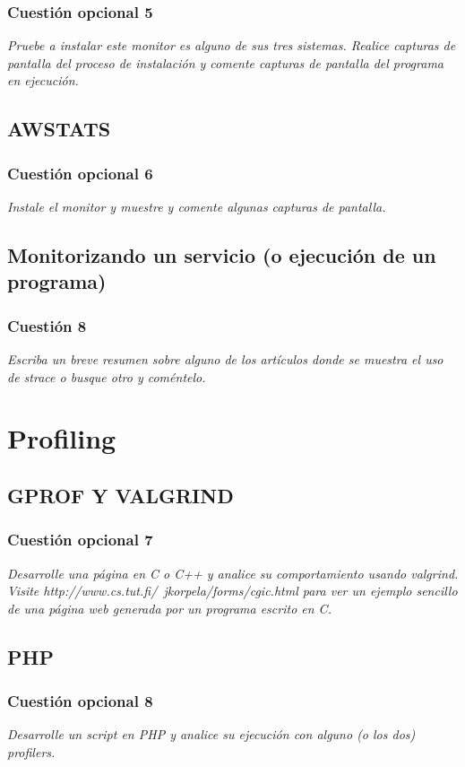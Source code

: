 \subsubsection{Cuestión opcional 5}
\textit{Pruebe a instalar este monitor es alguno de sus tres sistemas. Realice capturas de pantalla del proceso de instalación y comente capturas de pantalla del programa en ejecución.}
\subsection{AWSTATS}


\subsubsection{Cuestión opcional 6}
\textit{Instale el monitor y muestre y comente algunas capturas de pantalla.}
\subsection{Monitorizando un servicio (o ejecución de un programa)}

\subsubsection{Cuestión 8}
\textit{Escriba un breve resumen sobre alguno de los artículos donde se muestra el uso de strace o busque otro y coméntelo.}


\section{Profiling}
\subsection{GPROF Y VALGRIND}


\subsubsection{Cuestión opcional 7}
\textit{Desarrolle una página en C o C++ y analice su comportamiento usando valgrind. Visite http://www.cs.tut.fi/~jkorpela/forms/cgic.html para ver un ejemplo sencillo de una página web generada por un programa escrito en C.}
\subsection{PHP}


\subsubsection{Cuestión opcional 8}
\textit{Desarrolle un script en PHP y analice su ejecución con alguno (o los dos) profilers.}


